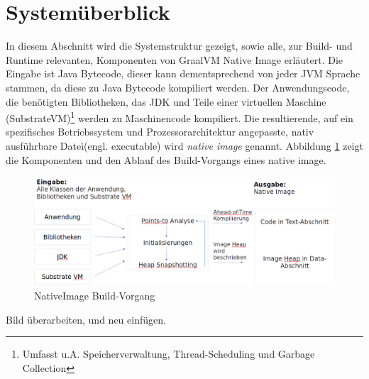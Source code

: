 \section{Systemüberblick}
\label{sec:system}
In diesem Abschnitt wird die Systemstruktur gezeigt, sowie alle, zur Build- und Runtime relevanten, Komponenten von GraalVM Native Image erläutert.
Die Eingabe ist Java Bytecode, dieser kann dementsprechend von jeder JVM Sprache stammen, da diese zu Java Bytecode kompiliert werden. Der Anwendungscode, die benötigten Bibliotheken, das JDK und Teile einer virtuellen Maschine (SubstrateVM)\footnote{Umfasst u.A. Speicherverwaltung, Thread-Scheduling und Garbage Collection} werden zu Maschinencode kompiliert. Die resultierende, auf ein spezifisches Betriebssystem und Prozessorarchitektur angepasste, nativ ausführbare Datei(engl. executable) wird \textit{native image} genannt. Abbildung \ref{fig:system_buildtime} zeigt die Komponenten und den Ablauf des Build-Vorgangs eines native image.

\begin{figure}[ht]
	\centering
	\includegraphics[width=1\textwidth]{resources/GraalVM_BuildTime.png}
	\caption{NativeImage Build-Vorgang}
	\label{fig:system_buildtime}
\end{figure}

\begin{todo}
	Bild überarbeiten, und neu einfügen.
\end{todo}

